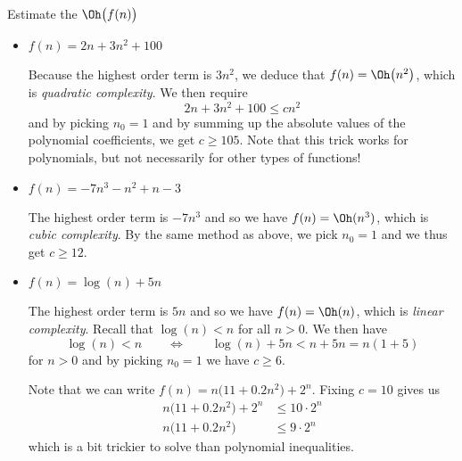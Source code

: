 \documentclass{practice}
\begin{document}
\begin{task}{Estimate the $\Oh\bigl(f(n)\bigr)$}
  \begin{itemize}
    \item $f(n) = 2n + 3n^2 + 100$
    
    Because the highest order term is $3n^2$, we deduce that $f(n) = \Oh\bigl(n^2\bigr)$, which is \emph{quadratic complexity}.
    We then require
    \[
      2n + 3n^2 + 100 \le cn^2
    \]
    and by picking $n_0=1$ and by summing up the absolute values of the polynomial coefficients, we get $c \ge 105$.
    Note that this trick works for polynomials, but not necessarily for other types of functions!

    \item $f(n) = -7n^3 - n^2 + n - 3$
    
    The highest order term is $-7n^3$ and so we have $f(n) = \Oh(n^3)$, which is \emph{cubic complexity}.
    By the same method as above, we pick $n_0=1$ and we thus get $c \ge 12$.

    \item $f(n) = \log(n) + 5n$
    
    The highest order term is $5n$ and so we have $f(n) = \Oh(n)$, which is \emph{linear complexity}.
    Recall that $\log(n) < n$ for all $n > 0$.
    We then have
    \[
      \log(n) < n
      \qquad\iff\qquad
      \log(n) + 5n < n + 5n = n(1 + 5)
    \]
    for $n>0$ and by picking $n_0 = 1$ we have $c \ge 6$.

    \iffalse
    \item $f(n) = 11n + 2^n + 0.2n^3$
    
    This is tricky, because we do not have a good way to solve the inequality:
    \[
      11n + 2^n + 0.2n^3 \le c2^n
    \]
    due to it being a mix of exponentials and polynomials.
    Let us fix $c = 10$ and compute the first and second derivatives of $h(n)=f(n)/(10g(n))$.

    We have
    \begin{align*}
      h'(n) &= \frac{10g(n)f'(n) - 10f(n)g'(n)}{(10g(n))^2}\\
      &=
    \end{align*}
    \fi
    
    \iffalse
    Note that we can write $f(n) = n\bigl(11 + 0.2n^2\bigr) + 2^n$.
    Fixing $c = 10$ gives us
    \begin{align*}
      n\bigl(11 + 0.2n^2\bigr) + 2^n &\le 10 \cdot 2^n\\
      n\bigl(11 + 0.2n^2\bigr) &\le 9\cdot 2^n
    \end{align*}
    which is a bit trickier to solve than polynomial inequalities.


\end{itemize}
\end{task}
\end{document}
